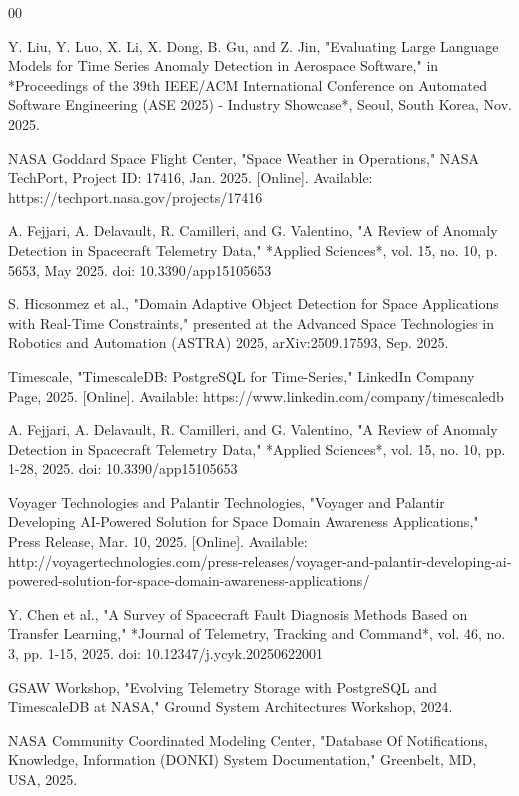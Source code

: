 \documentclass[conference]{IEEEtran}
\begin{document}
\begin{thebibliography}{00}

 Y. Liu, Y. Luo, X. Li, X. Dong, B. Gu, and Z. Jin, "Evaluating Large Language Models for Time Series Anomaly Detection in Aerospace Software," in *Proceedings of the 39th IEEE/ACM International Conference on Automated Software Engineering (ASE 2025) - Industry Showcase*, Seoul, South Korea, Nov. 2025.

 NASA Goddard Space Flight Center, "Space Weather in Operations," NASA TechPort, Project ID: 17416, Jan. 2025. [Online]. Available: https://techport.nasa.gov/projects/17416

 A. Fejjari, A. Delavault, R. Camilleri, and G. Valentino, "A Review of Anomaly Detection in Spacecraft Telemetry Data," *Applied Sciences*, vol. 15, no. 10, p. 5653, May 2025. doi: 10.3390/app15105653

 S. Hicsonmez et al., "Domain Adaptive Object Detection for Space Applications with Real-Time Constraints," presented at the Advanced Space Technologies in Robotics and Automation (ASTRA) 2025, arXiv:2509.17593, Sep. 2025.

 Timescale, "TimescaleDB: PostgreSQL for Time-Series," LinkedIn Company Page, 2025. [Online]. Available: https://www.linkedin.com/company/timescaledb

 A. Fejjari, A. Delavault, R. Camilleri, and G. Valentino, "A Review of Anomaly Detection in Spacecraft Telemetry Data," *Applied Sciences*, vol. 15, no. 10, pp. 1-28, 2025. doi: 10.3390/app15105653

 Voyager Technologies and Palantir Technologies, "Voyager and Palantir Developing AI-Powered Solution for Space Domain Awareness Applications," Press Release, Mar. 10, 2025. [Online]. Available: http://voyagertechnologies.com/press-releases/voyager-and-palantir-developing-ai-powered-solution-for-space-domain-awareness-applications/

 Y. Chen et al., "A Survey of Spacecraft Fault Diagnosis Methods Based on Transfer Learning," *Journal of Telemetry, Tracking and Command*, vol. 46, no. 3, pp. 1-15, 2025. doi: 10.12347/j.ycyk.20250622001

 GSAW Workshop, "Evolving Telemetry Storage with PostgreSQL and TimescaleDB at NASA," Ground System Architectures Workshop, 2024.

 NASA Community Coordinated Modeling Center, "Database Of Notifications, Knowledge, Information (DONKI) System Documentation," Greenbelt, MD, USA, 2025.


\end{thebibliography}
\end{document}
